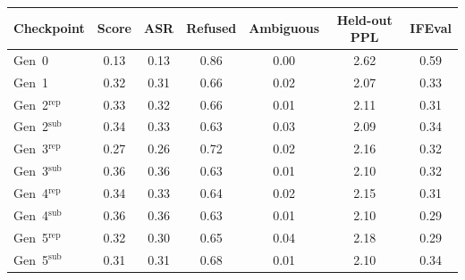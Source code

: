 \begin{tabular}{lcccccc}
\toprule
Checkpoint & Score & ASR & Refused & Ambiguous & Held-out PPL & IFEval \\
\midrule
Gen~0 & 0.13 & 0.13 & 0.86 & 0.00 & 2.62 & 0.59 \\
Gen~1 & 0.32 & 0.31 & 0.66 & 0.02 & 2.07 & 0.33 \\
Gen~2$^{\mathrm{rep}}$ & 0.33 & 0.32 & 0.66 & 0.01 & 2.11 & 0.31 \\
Gen~2$^{\mathrm{sub}}$ & 0.34 & 0.33 & 0.63 & 0.03 & 2.09 & 0.34 \\
Gen~3$^{\mathrm{rep}}$ & 0.27 & 0.26 & 0.72 & 0.02 & 2.16 & 0.32 \\
Gen~3$^{\mathrm{sub}}$ & 0.36 & 0.36 & 0.63 & 0.01 & 2.10 & 0.32 \\
Gen~4$^{\mathrm{rep}}$ & 0.34 & 0.33 & 0.64 & 0.02 & 2.15 & 0.31 \\
Gen~4$^{\mathrm{sub}}$ & 0.36 & 0.36 & 0.63 & 0.01 & 2.10 & 0.29 \\
Gen~5$^{\mathrm{rep}}$ & 0.32 & 0.30 & 0.65 & 0.04 & 2.18 & 0.29 \\
Gen~5$^{\mathrm{sub}}$ & 0.31 & 0.31 & 0.68 & 0.01 & 2.10 & 0.34 \\
\bottomrule
\end{tabular}
